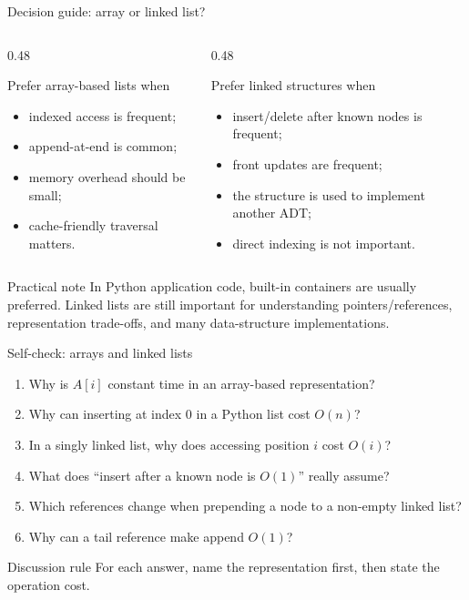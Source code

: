 \documentclass[aspectratio=169]{beamer}
\begin{document}
\begin{frame}{Decision guide: array or linked list?}
\small
\begin{columns}[T,onlytextwidth]
\begin{column}{0.48\textwidth}
\begin{exampleblock}{Prefer array-based lists when}
\begin{itemize}
  \item indexed access is frequent;
  \item append-at-end is common;
  \item memory overhead should be small;
  \item cache-friendly traversal matters.
\end{itemize}
\end{exampleblock}
\end{column}
\begin{column}{0.48\textwidth}
\begin{alertblock}{Prefer linked structures when}
\begin{itemize}
  \item insert/delete after known nodes is frequent;
  \item front updates are frequent;
  \item the structure is used to implement another ADT;
  \item direct indexing is not important.
\end{itemize}
\end{alertblock}
\end{column}
\end{columns}

\begin{block}{Practical note}
In Python application code, built-in containers are usually preferred. Linked lists are still important for understanding pointers/references, representation trade-offs, and many data-structure implementations.
\end{block}
\end{frame}

\begin{frame}{Self-check: arrays and linked lists}
\small
\begin{enumerate}
  \item Why is $A[i]$ constant time in an array-based representation?
  \item Why can inserting at index $0$ in a Python list cost $O(n)$?
  \item In a singly linked list, why does accessing position $i$ cost $O(i)$?
  \item What does ``insert after a known node is $O(1)$'' really assume?
  \item Which references change when prepending a node to a non-empty linked list?
  \item Why can a tail reference make append $O(1)$?
\end{enumerate}
\begin{block}{Discussion rule}
For each answer, name the representation first, then state the operation cost.
\end{block}
\end{frame}
\end{document}
